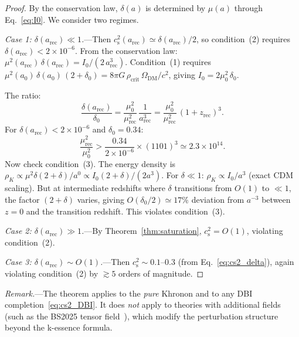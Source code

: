 \documentclass[prd,twocolumn,superscriptaddress,longbibliography,floatfix]{revtex4-2}
\newcommand{\cs}{c_{\mathrm{s}}}
\begin{document}
\begin{proof}
By the conservation law, $\delta(a)$ is determined by
$\mu(a)$ through Eq.~\eqref{eq:I0}.  We consider two
regimes.

\emph{Case 1: $\delta(a_{\mathrm{rec}}) \ll 1$.}---Then
$\cs^2(a_{\mathrm{rec}}) \simeq \delta(a_{\mathrm{rec}})/2$,
so condition~(2) requires
$\delta(a_{\mathrm{rec}}) < 2 \times 10^{-6}$.
From the conservation law:
$\mu^2(a_{\mathrm{rec}})\,\delta(a_{\mathrm{rec}})
= I_0/(2\,a_{\mathrm{rec}}^3)$.
Condition~(1) requires
$\mu^2(a_0)\,\delta(a_0)\,(2{+}\delta_0)
= 8\pi G\,\rho_{\mathrm{crit}}\,\Omega_{\mathrm{DM}}/c^2$,
giving $I_0 = 2\mu^2_0\,\delta_0$.

The ratio:
\begin{equation}
\frac{\delta(a_{\mathrm{rec}})}{\delta_0}
= \frac{\mu_0^2}{\mu_{\mathrm{rec}}^2}\,
\frac{1}{a_{\mathrm{rec}}^3}
= \frac{\mu_0^2}{\mu_{\mathrm{rec}}^2}\,(1{+}z_{\mathrm{rec}})^3.
\label{eq:ratio}
\end{equation}
For $\delta(a_{\mathrm{rec}}) < 2\times10^{-6}$ and
$\delta_0 = 0.34$:
\begin{equation}
\frac{\mu_{\mathrm{rec}}^2}{\mu_0^2}
> \frac{0.34}{2\times10^{-6}} \times (1101)^3
\simeq 2.3\times 10^{14}.
\label{eq:mu_ratio}
\end{equation}
Now check condition~(3).  The energy density is
$\rho_K \propto \mu^2\delta(2{+}\delta)/a^0
\propto I_0(2{+}\delta)/(2a^3)$.
For $\delta \ll 1$: $\rho_K \propto I_0/a^3$
(exact CDM scaling).  But at intermediate redshifts
where $\delta$ transitions from $O(1)$ to $\ll 1$,
the factor $(2{+}\delta)$ varies, giving
$O(\delta_0/2) \simeq 17\%$ deviation from $a^{-3}$
between $z = 0$ and the transition redshift.
This violates condition~(3).

\emph{Case 2: $\delta(a_{\mathrm{rec}}) \gg 1$.}---By
Theorem~\ref{thm:saturation}, $\cs^2 = O(1)$, violating
condition~(2).

\emph{Case 3: $\delta(a_{\mathrm{rec}}) \sim O(1)$.}---Then
$\cs^2 \sim 0.1$--$0.3$ (from Eq.~\ref{eq:cs2_delta}),
again violating condition~(2) by $\gtrsim 5$ orders of
magnitude.
\end{proof}

\emph{Remark.}---The theorem applies to the \emph{pure}
Khronon and to any DBI completion~\eqref{eq:cs2_DBI}.
It does \emph{not} apply to theories with additional
fields (such as the BS2025 tensor
field~\cite{BS2025}), which modify the perturbation
structure beyond the k-essence formula.


\end{document}
